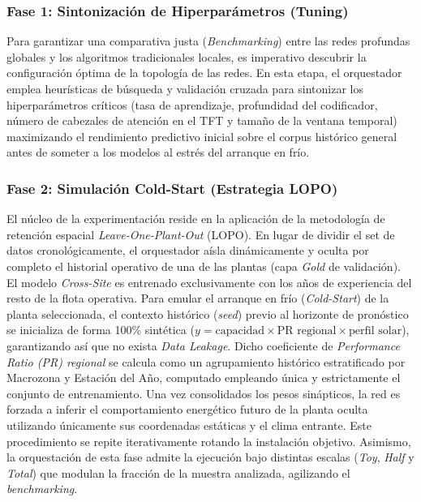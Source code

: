 \subsubsection{Fase 1: Sintonización de Hiperparámetros (Tuning)}
Para garantizar una comparativa justa (\textit{Benchmarking}) entre las redes profundas globales y los algoritmos tradicionales locales, es imperativo descubrir la configuración óptima de la topología de las redes. En esta etapa, el orquestador emplea heurísticas de búsqueda y validación cruzada para sintonizar los hiperparámetros críticos (tasa de aprendizaje, profundidad del codificador, número de cabezales de atención en el TFT y tamaño de la ventana temporal) maximizando el rendimiento predictivo inicial sobre el corpus histórico general antes de someter a los modelos al estrés del arranque en frío.

\subsubsection{Fase 2: Simulación Cold-Start (Estrategia LOPO)}
El núcleo de la experimentación reside en la aplicación de la metodología de retención espacial \textit{Leave-One-Plant-Out} (LOPO). En lugar de dividir el set de datos cronológicamente, el orquestador aísla dinámicamente y oculta por completo el historial operativo de una de las plantas (capa \textit{Gold} de validación). 
El modelo \textit{Cross-Site} es entrenado exclusivamente con los años de experiencia del resto de la flota operativa. Para emular el arranque en frío (\textit{Cold-Start}) de la planta seleccionada, el contexto histórico (\textit{seed}) previo al horizonte de pronóstico se inicializa de forma 100\% sintética ($y = \text{capacidad} \times \text{PR regional} \times \text{perfil solar}$), garantizando así que no exista \textit{Data Leakage}. Dicho coeficiente de \textit{Performance Ratio (PR) regional} se calcula como un agrupamiento histórico estratificado por Macrozona y Estación del Año, computado empleando única y estrictamente el conjunto de entrenamiento. Una vez consolidados los pesos sinápticos, la red es forzada a inferir el comportamiento energético futuro de la planta oculta utilizando únicamente sus coordenadas estáticas y el clima entrante. Este procedimiento se repite iterativamente rotando la instalación objetivo. Asimismo, la orquestación de esta fase admite la ejecución bajo distintas escalas (\textit{Toy}, \textit{Half} y \textit{Total}) que modulan la fracción de la muestra analizada, agilizando el \textit{benchmarking}.

